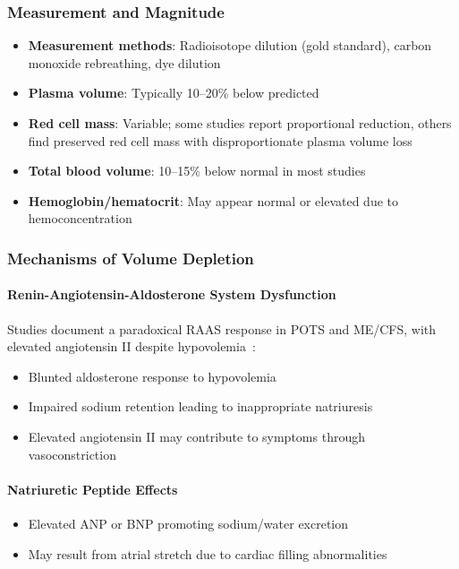 \subsubsection{Measurement and Magnitude}

\begin{itemize}
    \item \textbf{Measurement methods}: Radioisotope dilution (gold standard), carbon monoxide rebreathing, dye dilution
    \item \textbf{Plasma volume}: Typically 10--20\% below predicted~\cite{Streeten1998blood}
    \item \textbf{Red cell mass}: Variable; some studies report proportional reduction, others find preserved red cell mass with disproportionate plasma volume loss
    \item \textbf{Total blood volume}: 10--15\% below normal in most studies~\cite{Newton2016}
    \item \textbf{Hemoglobin/hematocrit}: May appear normal or elevated due to hemoconcentration
\end{itemize}

\subsubsection{Mechanisms of Volume Depletion}

\paragraph{Renin-Angiotensin-Aldosterone System Dysfunction}
Studies document a paradoxical RAAS response in POTS and ME/CFS, with elevated angiotensin II despite hypovolemia~\cite{Raj2005,Stewart2006}:
\begin{itemize}
    \item Blunted aldosterone response to hypovolemia~\cite{Raj2005}
    \item Impaired sodium retention leading to inappropriate natriuresis
    \item Elevated angiotensin II may contribute to symptoms through vasoconstriction~\cite{Stewart2006}
\end{itemize}

\paragraph{Natriuretic Peptide Effects}
\begin{itemize}
    \item Elevated ANP or BNP promoting sodium/water excretion
    \item May result from atrial stretch due to cardiac filling abnormalities
\end{itemize}

